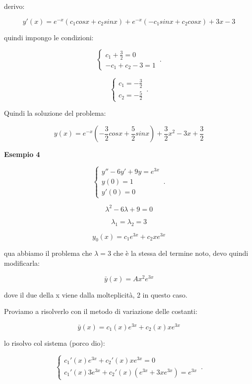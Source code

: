 \documentclass[../appunti-analisi.tex]{subfiles}
\begin{document}
derivo:

\[
    y'(x) = e ^{-x}(c_1 cosx+ c_2 sinx) + e ^{-x}(-c_1sinx+c_2 cosx) +3x -3
\]

quindi impongo le condizioni:

    \begin{equation}
        \begin{cases}
            c_1 +\frac{3}{2}=0\\
            -c_1+c_2 -3 = 1
        \end{cases}\,.
    \end{equation}

    \begin{equation}
        \begin{cases}
            c_1=-\frac{3}{2}\\
            c_2=-\frac{5}{2}
        \end{cases}\,.
    \end{equation}

Quindi la soluzione del problema:

\[
    y(x) = e ^{-x}(-\frac{3}{2}cosx + \frac{5}{2} sinx) + \frac{3}{2}x^{2}-3x + \frac{3}{2}
\]

\textbf{Esempio 4} 

    \begin{equation}
        \begin{cases}
            y''-6y' + 9y = e ^{3x}\\
            y(0) = 1\\
            y'(0) = 0
        \end{cases}\,.
    \end{equation}

\[
    \lambda^{2} -6 \lambda + 9 = 0
\]

\[
    \lambda_1=\lambda_2=3
\]

\[
    y_0(x)  = c_1 e ^{3x}+ c_2 x e ^{3x}
\]

qua abbiamo il problema che $\lambda=3$ che è la stessa del termine noto, devo quindi modificarla:

\[
    \bar{y} (x) = A x^{2}e ^{3x}
\]

dove il due della x viene dalla molteplicità, 2 in questo caso.

Proviamo a risolverlo con il metodo di variazione delle costanti:

\[
    \bar{y} (x) = c_1(x) e ^{3x}+ c_2(x) x e^{3x}
\]

lo risolvo col sistema (porco dio):

    \begin{equation}
        \begin{cases}
    c_1'(x)e ^{3x} + c_2'(x) x e ^{3x}=0 \\
    c_1'(x) 3 e ^{3x} + c_2'(x) (e ^{3x} + 3x e ^{3x}) = e ^{3x}
        \end{cases}\,.
    \end{equation}
\end{document}

